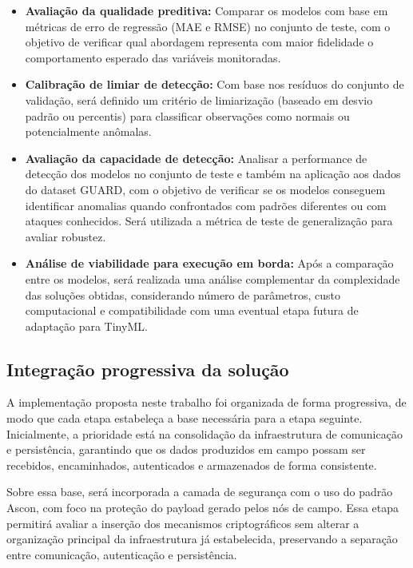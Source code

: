 \begin{itemize}
    \item \textbf{Avaliação da qualidade preditiva:} Comparar os modelos com base em métricas de erro de regressão (MAE e RMSE) no conjunto de teste, com o objetivo de verificar qual abordagem representa com maior fidelidade o comportamento esperado das variáveis monitoradas.

    \item \textbf{Calibração de limiar de detecção:} Com base nos resíduos do conjunto de validação, será definido um critério de limiarização (baseado em desvio padrão ou percentis) para classificar observações como normais ou potencialmente anômalas.

    \item \textbf{Avaliação da capacidade de detecção:} Analisar a performance de detecção dos modelos no conjunto de teste e também na aplicação aos dados do dataset GUARD, com o objetivo de verificar se os modelos conseguem identificar anomalias quando confrontados com padrões diferentes ou com ataques conhecidos. Será utilizada a métrica de teste de generalização para avaliar robustez.

    \item \textbf{Análise de viabilidade para execução em borda:} Após a comparação entre os modelos, será realizada uma análise complementar da complexidade das soluções obtidas, considerando número de parâmetros, custo computacional e compatibilidade com uma eventual etapa futura de adaptação para TinyML.
\end{itemize}


\subsection{Integração progressiva da solução}

A implementação proposta neste trabalho foi organizada de forma progressiva, de modo que cada etapa estabeleça a base necessária para a etapa seguinte. Inicialmente, a prioridade está na consolidação da infraestrutura de comunicação e persistência, garantindo que os dados produzidos em campo possam ser recebidos, encaminhados, autenticados e armazenados de forma consistente.

Sobre essa base, será incorporada a camada de segurança com o uso do padrão Ascon, com foco na proteção do payload gerado pelos nós de campo. Essa etapa permitirá avaliar a inserção dos mecanismos criptográficos sem alterar a organização principal da infraestrutura já estabelecida, preservando a separação entre comunicação, autenticação e persistência.

